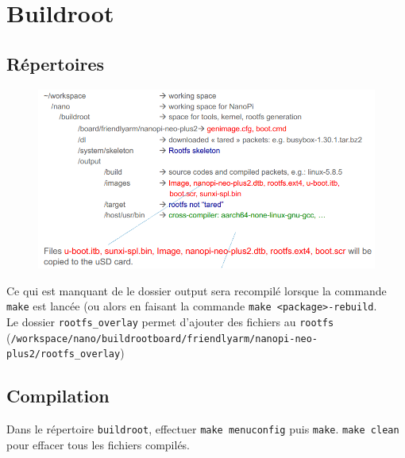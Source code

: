 \documentclass[resume]{subfiles}
\begin{document}
\section{Buildroot}
\subsection{Répertoires}
\begin{figure}[H]
\centering
\includegraphics[width=\columnwidth]{img_1.png}
\end{figure}
Ce qui est manquant de le dossier output sera recompilé lorsque la commande \verb!make! est lancée (ou alors en faisant la commande \verb!make <package>-rebuild!.\\
Le dossier \verb!rootfs_overlay! permet d'ajouter des fichiers au \verb!rootfs!
(\verb!/workspace/nano/buildrootboard/friendlyarm/nanopi-neo-plus2/rootfs_overlay!)
\subsection{Compilation}
Dans le répertoire \verb!buildroot!, effectuer \verb!make menuconfig! puis \verb!make!. \verb!make clean! pour effacer tous les fichiers compilés.
\end{document}
